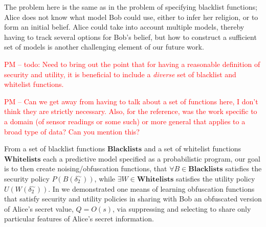 \documentclass{article} %
\newcommand{\pxm}[1]{\textcolor{red}{PM -- #1}}
\newcommand{\blacklists}[0]{\textbf{Blacklists}}
\newcommand{\whitelists}[0]{\textbf{Whitelists}}
\theoremstyle{plain} %
\theoremstyle{definition} %
\begin{document}
The problem here is the same as in the problem of specifying blacklist
functions; Alice does not know what model Bob could use, either to
infer her religion, or to form an initial belief. Alice could take
into account multiple models, thereby having to track several options
for Bob's belief, but how to construct a sufficient set of models is
another challenging element of our future work.


\pxm{todo: Need to bring out the point that for  having a reasonable
definition of security and utility, it is beneficial to include a
\emph{diverse} set of blacklist and whitelist functions.}

\pxm{Can we get away from having to talk about a set of functions
  here, I don't think they are strictly necessary. Also, for the
  reference, was the work specific to a domain (of sensor readings or
  some such) or more general that applies to a broad type of data?
  Can you mention this?}

From a set of blacklist functions $\blacklists$ and a set of whitelist
functions $\whitelists$ each a predictive model specified as a
probabilistic program, our goal is to then create noising/obfuscation
functions, that $ \forall B \in \blacklists $ satisfies the security
policy $ P(B(\delta_2^\sim)) $, while $ \exists W \in \whitelists $
satisfies the utility policy $ U(W(\delta_2^\sim)) $.  In
\cite{chakraborty12balancing} we demonstrated one means of learning
obfuscation functions that satisfy security and utility policies in
sharing with Bob an obfuscated version of Alice's secret value, $ Q =
O(s) $, via suppressing and selecting to share only particular
features of Alice's secret information.





\end{document}
